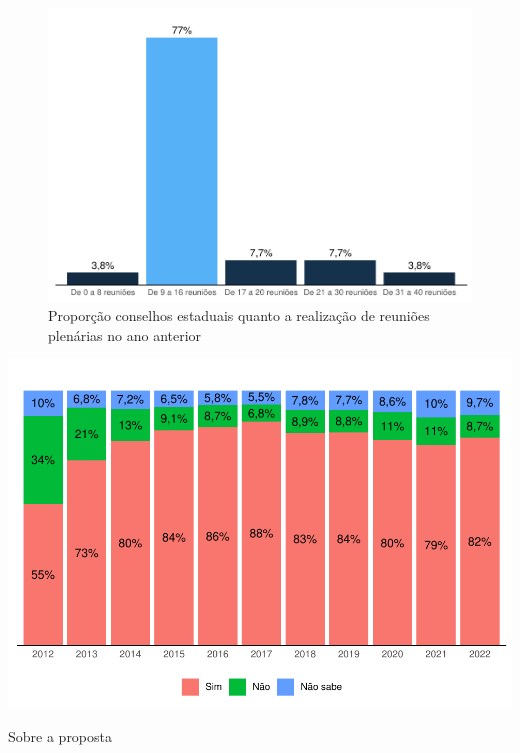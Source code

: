 \documentclass[
  brazilian]{report}
\begin{document}
\begin{figure}
\includegraphics{Censo-SUAS-2022_files/figure-latex/qtdceas_reuniao-1} \caption[Proporção conselhos estaduais quanto a realização de reuniões plenárias no ano anterior]{Proporção conselhos estaduais quanto a realização de reuniões plenárias no ano anterior}\label{fig:qtdceas_reuniao}
\end{figure}

\includegraphics{Censo-SUAS-2022_files/figure-latex/unnamed-chunk-3-1}

Sobre a proposta
\end{document}
